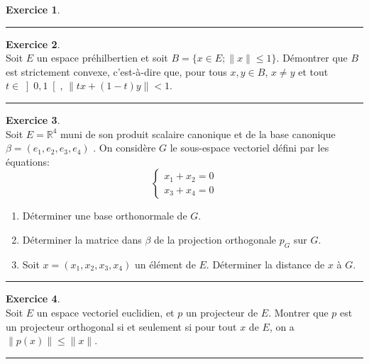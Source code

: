 \documentclass[a4paper,10pt]{article}
\theoremstyle{definition}
\theoremstyle{definition}
\newtheorem{exo}{Exercice}
\newcommand{\R}{\mathbb{R}}
\begin{document}
\begin{minipage}{1\linewidth}
\begin{minipage}[t]{0.48\linewidth}
\begin{exo}
		\centering
		\rule{1\linewidth}{0.6pt}
		\end{exo}	
	
		\begin{exo}\quad\\[0.25cm]
		Soit $E$ un espace préhilbertien et soit $B=\{x\in E; \|x\| \leq 1\}$. Démontrer que $B$ est strictement convexe, c'est-à-dire que, pour tous $x,y\in B$, $x \neq y$ et tout $t\in \left]0,1\right[ $, $\|tx+(1-t)y\|<1$.
		
		\centering
		\rule{1\linewidth}{0.6pt}
		\end{exo}	
			
		\begin{exo}\quad\\[0.25cm]
		Soit $E= \R^4$ muni de son produit scalaire canonique et de la base canonique $\beta = (e_1, e_2, e_3, e_4) $ . On considère $G$ le sous-espace vectoriel défini par les équations:
		$$\left\{\begin{array}{c}
		x_1 + x_2 = 0\\
		x_3 + x_4 = 0
		\end{array}\right.$$ 
		\begin{enumerate}
			\item Déterminer une base orthonormale de $G$.
			
			\item Déterminer la matrice dans $\beta$
			de la projection orthogonale $p_G$ sur $G$.
			
			\item Soit $x=(x_1,x_2,x_3,x_4)$ un élément de $E$. Déterminer la distance de $x$ à $G$. 
		\end{enumerate}
	
		\centering
		\rule{1\linewidth}{0.6pt}
		\end{exo}
	
		
		\begin{exo}\quad\\[0.25cm]
		
		Soit $E$ un espace vectoriel euclidien, et $p$ un projecteur de $E$. Montrer que $p$ est un projecteur orthogonal si et seulement si pour tout $x$ de $E$, on a $\|p(x)\|\leq \|x\|$.
		
		\centering
		\rule{1\linewidth}{0.6pt}
		\end{exo}
		
		
	\end{minipage}
\end{minipage}	
\end{document}
